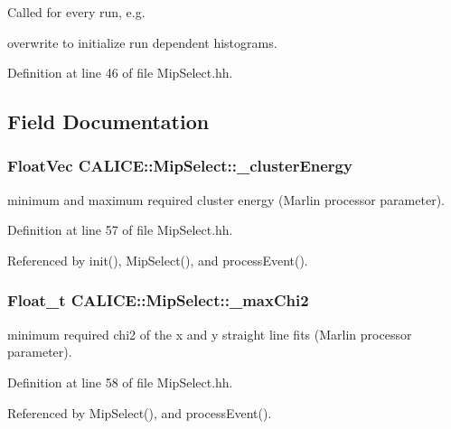 Called for every run, e.\-g. 

overwrite to initialize run dependent histograms. 

Definition at line 46 of file Mip\-Select.\-hh.



\subsection{Field Documentation}
\subsubsection[{\-\_\-cluster\-Energy}]{\setlength{\rightskip}{0pt plus 5cm}Float\-Vec C\-A\-L\-I\-C\-E\-::\-Mip\-Select\-::\-\_\-cluster\-Energy\hspace{0.3cm}{\ttfamily [protected]}}\label{classCALICE_1_1MipSelect_a4724ccf37d271a114791a2d0d5575cb9}


minimum and maximum required cluster energy (Marlin processor parameter). 



Definition at line 57 of file Mip\-Select.\-hh.



Referenced by init(), Mip\-Select(), and process\-Event().

\subsubsection[{\-\_\-max\-Chi2}]{\setlength{\rightskip}{0pt plus 5cm}Float\-\_\-t C\-A\-L\-I\-C\-E\-::\-Mip\-Select\-::\-\_\-max\-Chi2\hspace{0.3cm}{\ttfamily [protected]}}\label{classCALICE_1_1MipSelect_a9ad0ff3988f10698ba6398158fdba7d3}


minimum required chi2 of the x and y straight line fits (Marlin processor parameter). 



Definition at line 58 of file Mip\-Select.\-hh.



Referenced by Mip\-Select(), and process\-Event().

